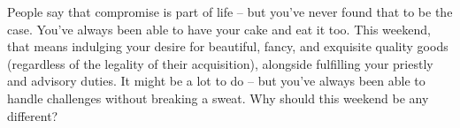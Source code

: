 \documentclass[char]{GL2020}
\begin{document}
People say that compromise is part of life -- but you’ve never found that to be the case. You’ve always been able to have your cake and eat it too. This weekend, that means indulging your desire for beautiful, fancy, and exquisite quality goods (regardless of the legality of their acquisition), alongside fulfilling your priestly and advisory duties. It might be a lot to do -- but you’ve always been able to handle challenges without breaking a sweat. Why should this weekend be any different?


%
%
%
%
%
%
%
%
\end{document}
